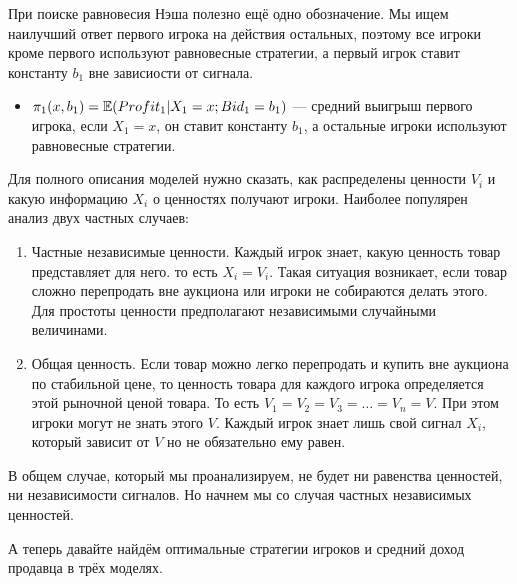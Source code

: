 При поиске равновесия Нэша полезно ещё одно обозначение. Мы ищем наилучший ответ первого игрока на действия остальных, поэтому все игроки кроме первого используют равновесные стратегии, а первый игрок ставит константу $b_1$ вне зависиости от сигнала.

\begin{itemize}



\item $\pi_{1}(x,b_{1})=\mathbb{E}(Profit_{1}|X_{1}=x ; Bid_{1}=b_{1})$ — средний выигрыш первого игрока, если $ X_{1}=x $, он ставит константу $b_{1} $, а остальные игроки используют равновесные стратегии.
\end{itemize}

\newpage


Для полного описания моделей нужно сказать, как распределены ценности $ V_{i} $ и какую информацию $ X_{i} $ о ценностях получают игроки. Наиболее популярен анализ двух частных случаев:
\begin{enumerate}
\item Частные независимые ценности. Каждый игрок знает, какую ценность товар представляет для него. то есть $X_{i}=V_{i}$.
Такая ситуация возникает, если товар сложно перепродать вне аукциона или игроки не собираются делать этого. Для простоты ценности предполагают независимыми случайными величинами.
\item Общая ценность. Если товар можно легко перепродать и купить вне аукциона по стабильной цене, то ценность товара для каждого игрока определяется этой рыночной ценой товара. То есть $ V_{1}=V_{2}=V_{3}=\ldots=V_{n}=V $. При этом игроки могут не знать этого $ V $. Каждый игрок знает лишь свой сигнал $ X_{i} $, который зависит от $ V $ но не обязательно ему равен.
\end{enumerate}

В общем случае, который мы проанализируем, не будет ни равенства ценностей, ни независимости сигналов. Но начнем мы со случая частных независимых ценностей.

А теперь давайте найдём оптимальные стратегии игроков и средний доход продавца в трёх моделях.

